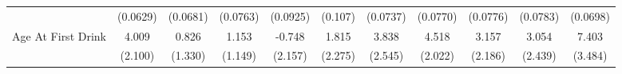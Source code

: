 {\begin{tabular}{l*{10}{c}}
            &    (0.0629)         &    (0.0681)         &    (0.0763)         &    (0.0925)         &     (0.107)         &    (0.0737)         &    (0.0770)         &    (0.0776)         &    (0.0783)         &    (0.0698)         \\
\addlinespace
Age At First Drink&       4.009         &       0.826         &       1.153         &      -0.748         &       1.815         &       3.838         &       4.518\sym{*}  &       3.157         &       3.054         &       7.403\sym{*}  \\
            &     (2.100)         &     (1.330)         &     (1.149)         &     (2.157)         &     (2.275)         &     (2.545)         &     (2.022)         &     (2.186)         &     (2.439)         &     (3.484)         \\
\bottomrule
\end{tabular}
}
